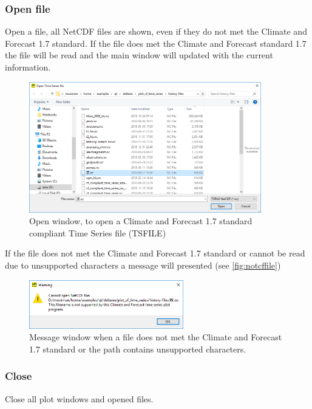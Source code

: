 \documentclass{deltares_memo}
\newcommand{\netcdf}{NetCDF\xspace}
\newcommand{\cfstandard}{Climate and Forecast 1.7 standard\xspace}
\begin{document}
\subsubsection{Open file}
Open a file, all \netcdf files are shown, even if they do not met the \cfstandard.
If the file does met the Climate and Forecast standard 1.7 the file will be read and the main window will updated with the current information. 
%
\begin{figure}[H]
    \centering    
    \includegraphics[width=0.9\textwidth]{pictures/menu_file_open.png}
    \caption{Open window, to open a \cfstandard compliant Time Series file (TSFILE)}
\end{figure}

If the file does not met the \cfstandard or cannot be read due to unsupported characters a message will presented (see \autoref{fig:notcffile})
\begin{figure}[H]
    \centering    
    \includegraphics[width=0.6\textwidth]{pictures/message_not_cf_file.png}
    \caption{Message window when a file does not met the \cfstandard or the path contains unsupported characters.\label{fig:notcffile}}
\end{figure}

\subsubsection{Close}
Close all plot windows and opened files.
\end{document}
